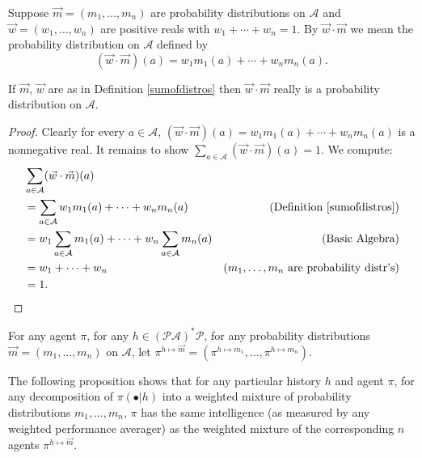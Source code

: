 \documentclass[runningheads]{llncs}
\begin{document}
\begin{definition}
\label{sumofdistros}
    Suppose $\vec m=(m_1,\ldots,m_n)$ are probability distributions on $\mathcal A$
    and $\vec w=(w_1,\ldots,w_n)$ are positive reals with
    $w_1+\cdots+w_n=1$. By $\vec w\cdot\vec m$ we mean the probability distribution
    on $\mathcal A$ defined by
    \[
        (\vec w\cdot\vec m)(a) = w_1m_1(a) + \cdots + w_nm_n(a).
    \]
\end{definition}

\begin{lemma}
    If $\vec m$, $\vec w$ are as in Definition \ref{sumofdistros}
    then $\vec w\cdot\vec m$ really is a probability distribution on $\mathcal A$.
\end{lemma}

\begin{proof}
    Clearly for every $a\in\mathcal A$,
    $(\vec w\cdot\vec m)(a) = w_1m_1(a) + \cdots + w_nm_n(a)$ is a nonnegative
    real. It remains to show $\sum_{a\in\mathcal A}(\vec w\cdot\vec m)(a)=1$.
    We compute:
    \begin{align*}
        &{} \sum_{a\in\mathcal A}(\vec w\cdot\vec m)(a)\\
        &=
        \sum_{a\in\mathcal A} w_1m_1(a) + \cdots + w_nm_n(a)
            &\mbox{(Definition \ref{sumofdistros})}\\
        &=
        w_1\sum_{a\in\mathcal A} m_1(a) + \cdots + w_n\sum_{a\in\mathcal A}m_n(a)
            &\mbox{(Basic Algebra)}\\
        &= w_1 + \cdots + w_n
            &\mbox{($m_1,\ldots,m_n$ are probability distr's)}\\
        &= 1.
    \end{align*}
\end{proof}

\begin{definition}
    For any agent $\pi$, for any $h\in(\mathcal P\mathcal A)^*\mathcal P$,
    for any probability distributions $\vec m=(m_1,\ldots,m_n)$ on $\mathcal A$,
    let $\pi^{h\mapsto \vec m}=(\pi^{h\mapsto m_1},\ldots,\pi^{h\mapsto m_n})$.
\end{definition}

The following proposition shows that
for any particular history $h$ and agent $\pi$,
for any decomposition of $\pi(\bullet|h)$ into a weighted mixture
of probability distributions $m_1,\ldots,m_n$,
$\pi$ has the same intelligence (as measured by any weighted performance
averager) as the weighted mixture of the corresponding $n$ agents
$\pi^{h\mapsto \vec m}$.
\end{document}
